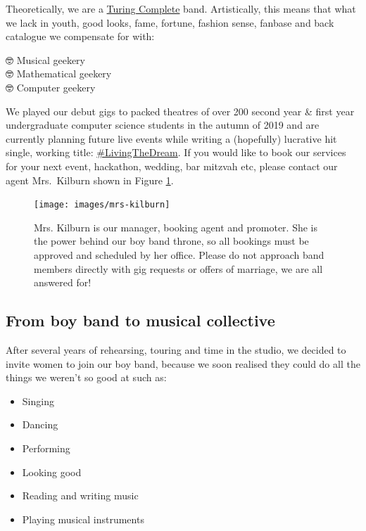 \documentclass[
  12pt,
]{book}
\providecommand{\tightlist}{%
  \setlength{\itemsep}{0pt}\setlength{\parskip}{0pt}}
\begin{document}
Theoretically, we are a \href{https://en.wikipedia.org/wiki/Turing_completeness}{Turing Complete} band. \citep{Turing1937, turingcomplete} Artistically, this means that what we lack in youth, good looks, fame, fortune, fashion sense, fanbase and back catalogue we compensate for with:

🤓 Musical geekery \citep{musicnmaths, behindthemusic}\\
🤓 Mathematical geekery \citep{plusmaths}\\
🤓 Computer geekery \citep{Aaron2016}

We played our debut gigs to packed theatres of over 200 second year \& first year undergraduate computer science students in the autumn of 2019 and are currently planning future live events while writing a (hopefully) lucrative hit single, working title: \href{https://twitter.com/hashtag/LivingTheDream}{\#LivingTheDream}. If you would like to book our services for your next event, hackathon, wedding, bar mitzvah etc, please contact our agent Mrs.~Kilburn shown in Figure \ref{fig:mrskilburn-fig}.

\begin{figure}

{\centering \texttt{[image: images/mrs-kilburn]} 

}

\caption{Mrs. Kilburn is our manager, booking agent and promoter. She is the power behind our boy band throne, so all bookings must be approved and scheduled by her office. Please do not approach band members directly with gig requests or offers of marriage, we are all answered for!}\label{fig:mrskilburn-fig}
\end{figure}

\hypertarget{collective}{%
\subsection{From boy band to musical collective}\label{collective}}

After several years of rehearsing, touring and time in the studio, we decided to invite women to join our boy band, because we soon realised they could do all the things we weren't so good at such as:

\begin{itemize}
\tightlist
\item
  Singing
\item
  Dancing
\item
  Performing
\item
  Looking good
\item
  Reading and writing music
\item
  Playing musical instruments
\end{itemize}
\end{document}
